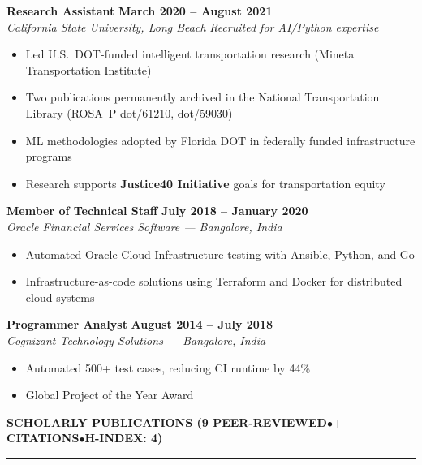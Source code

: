\documentclass[11pt]{article}
\newcommand{\sect}[1]{%
  \vspace{10pt}%
  {\color{sectioncolor}\large\bfseries\MakeUppercase{#1}}\\[-6pt]%
  {\color{rulecolor}\rule{\textwidth}{1.2pt}}%
  \vspace{4pt}%
}
\newcommand{\job}[4]{%
  \textbf{#1} \hfill \textbf{#2}\\
  \textit{#3} \hfill \textit{#4}%
}
\begin{document}
\vspace{4pt}
\job{Research Assistant}{March 2020 -- August 2021}%
    {California State University, Long Beach}%
    {Recruited for AI/Python expertise}
\begin{itemize}
\setlength{\itemsep}{1pt}\setlength{\parsep}{0pt}\setlength{\topsep}{3pt}
    \item Led U.S.\ DOT-funded intelligent transportation research (Mineta Transportation Institute)
    \item Two publications permanently archived in the National Transportation Library (ROSA~P dot/61210, dot/59030)
    \item ML methodologies adopted by Florida DOT in federally funded infrastructure programs
    \item Research supports \textbf{Justice40 Initiative} goals for transportation equity
\end{itemize}

\vspace{4pt}
\job{Member of Technical Staff}{July 2018 -- January 2020}%
    {Oracle Financial Services Software --- Bangalore, India}{}
\begin{itemize}
\setlength{\itemsep}{1pt}\setlength{\parsep}{0pt}\setlength{\topsep}{3pt}
    \item Automated Oracle Cloud Infrastructure testing with Ansible, Python, and Go
    \item Infrastructure-as-code solutions using Terraform and Docker for distributed cloud systems
\end{itemize}

\vspace{4pt}
\job{Programmer Analyst}{August 2014 -- July 2018}%
    {Cognizant Technology Solutions --- Bangalore, India}{}
\begin{itemize}
\setlength{\itemsep}{1pt}\setlength{\parsep}{0pt}\setlength{\topsep}{3pt}
    \item Automated 500+ test cases, reducing CI runtime by 44\%
    \item Global Project of the Year Award
\end{itemize}

\sect{Scholarly Publications \normalfont\small(9 peer-reviewed\;\;$\bullet$\;\;37+ citations\;\;$\bullet$\;\;H-Index: 4)}
\end{document}

